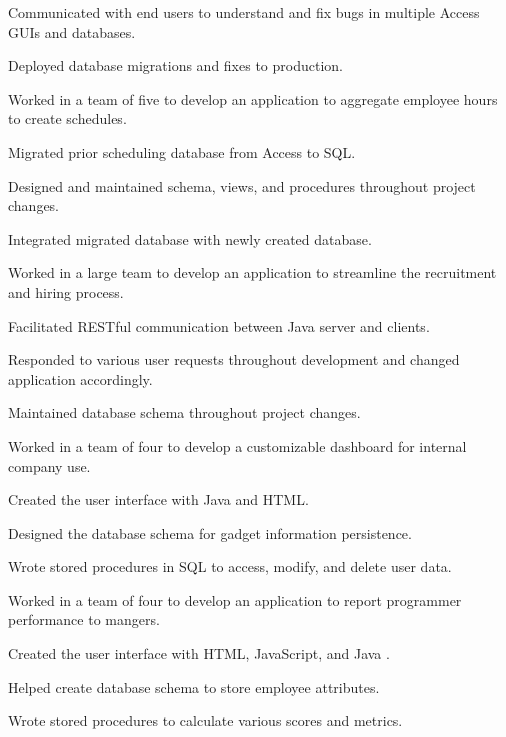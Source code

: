 \documentclass{marvinkassabian_resume}
\begin{document}
						\item Communicated with end users to understand and fix bugs in multiple Access GUIs and databases.
						\item Deployed database migrations and fixes to production.
					\resumesublistend
				\item[] 
					\resumesublistbegin
						\item Worked in a team of five to develop an application to aggregate employee hours to create schedules.
						\item Migrated prior scheduling database from Access to SQL.
						\item Designed and maintained schema, views, and procedures throughout project changes.
						\item Integrated migrated database with newly created database.
					\resumesublistend
				\item[] 
					\resumesublistbegin
						\item Worked in a large team to develop an application to streamline the recruitment and hiring process.
						\item Facilitated RESTful communication between Java server and clients.
						\item Responded to various user requests throughout development and changed application accordingly.
						\item Maintained database schema throughout project changes.
					\resumesublistend
				\item[] 
					\resumesublistbegin
						\item Worked in a team of four to develop a customizable dashboard for internal company use.
						\item Created the user interface with Java and HTML.
						\item Designed the database schema for gadget information persistence.
						\item Wrote stored procedures in SQL to access, modify, and delete user data.
					\resumesublistend
				\item[] 
					\resumesublistbegin
						\item Worked in a team of four to develop an application to report programmer performance to mangers.
						\item Created the user interface with HTML, JavaScript, and Java .
						\item Helped create database schema to store employee attributes.
						\item Wrote stored procedures to calculate various scores and metrics.
					\resumesublistend
			\resumesublistend
\end{document}
